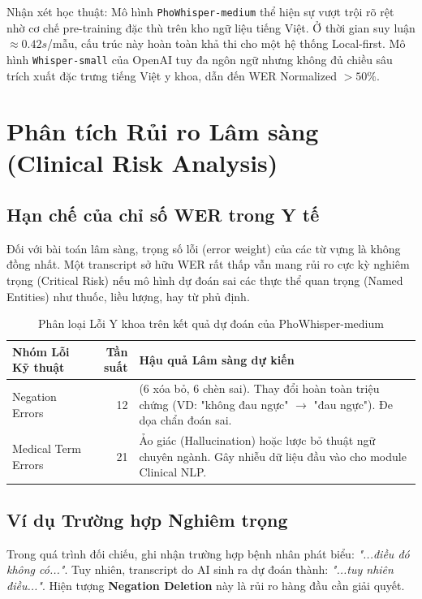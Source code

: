 \documentclass[12pt,a4paper]{article}
\begin{document}
Nhận xét học thuật:
Mô hình \texttt{PhoWhisper-medium} thể hiện sự vượt trội rõ rệt nhờ cơ chế pre-training đặc thù trên kho ngữ liệu tiếng Việt. Ở thời gian suy luận $\approx 0.42s$/mẫu, cấu trúc này hoàn toàn khả thi cho một hệ thống Local-first. Mô hình \texttt{Whisper-small} của OpenAI tuy đa ngôn ngữ nhưng không đủ chiều sâu trích xuất đặc trưng tiếng Việt y khoa, dẫn đến WER Normalized $>50\%$.

\section{Phân tích Rủi ro Lâm sàng (Clinical Risk Analysis)}

\subsection{Hạn chế của chỉ số WER trong Y tế}

Đối với bài toán lâm sàng, trọng số lỗi (error weight) của các từ vựng là không đồng nhất. Một transcript sở hữu WER rất thấp vẫn mang rủi ro cực kỳ nghiêm trọng (Critical Risk) nếu mô hình dự đoán sai các thực thể quan trọng (Named Entities) như thuốc, liều lượng, hay từ phủ định.

\begin{table}[h]
\centering
\caption{Phân loại Lỗi Y khoa trên kết quả dự đoán của PhoWhisper-medium}
\begin{tabularx}{\textwidth}{|l|r|X|}
\hline
\textbf{Nhóm Lỗi Kỹ thuật} & \textbf{Tần suất} & \textbf{Hậu quả Lâm sàng dự kiến} \\
\hline
Negation Errors & 12 & (6 xóa bỏ, 6 chèn sai). Thay đổi hoàn toàn triệu chứng (VD: "không đau ngực" $\rightarrow$ "đau ngực"). Đe dọa chẩn đoán sai. \\
\hline
Medical Term Errors & 21 & Ảo giác (Hallucination) hoặc lược bỏ thuật ngữ chuyên ngành. Gây nhiễu dữ liệu đầu vào cho module Clinical NLP. \\
\hline
\end{tabularx}
\end{table}

\subsection{Ví dụ Trường hợp Nghiêm trọng}

Trong quá trình đối chiếu, ghi nhận trường hợp bệnh nhân phát biểu: \textit{"...điều đó không có..."}. Tuy nhiên, transcript do AI sinh ra dự đoán thành: \textit{"...tuy nhiên điều..."}. Hiện tượng \textbf{Negation Deletion} này là rủi ro hàng đầu cần giải quyết.
\end{document}
